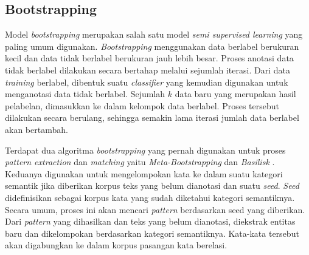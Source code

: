 \subsection{Bootstrapping}
Model \textit{bootstrapping} merupakan salah satu model \textit{semi supervised learning} yang paling umum digunakan. \textit{Bootstrapping} menggunakan data berlabel berukuran kecil dan data tidak berlabel berukuran jauh lebih besar. Proses anotasi data tidak berlabel dilakukan secara bertahap melalui sejumlah iterasi. Dari data \textit{training} berlabel, dibentuk suatu \textit{classifier} yang kemudian digunakan untuk menganotasi data tidak berlabel. Sejumlah $k$ data baru yang merupakan hasil pelabelan, dimasukkan ke dalam kelompok data berlabel. Proses tersebut dilakukan secara berulang, sehingga semakin lama iterasi jumlah data berlabel akan bertambah. 

Terdapat dua algoritma \textit{bootstrapping} yang pernah digunakan untuk proses \textit{pattern extraction} dan \textit{matching} yaitu \textit{Meta-Bootstrapping} dan \textit{Basilisk} \citep{riloff2003learning}. Keduanya digunakan untuk mengelompokan kata ke dalam suatu kategori semantik jika diberikan korpus teks yang belum dianotasi dan suatu \textit{seed}. \textit{Seed} didefinisikan sebagai korpus kata yang sudah diketahui kategori semantiknya. Secara umum, proses ini akan mencari \textit{pattern} berdasarkan seed yang diberikan. Dari \textit{pattern} yang dihasilkan dan teks yang belum dianotasi, diekstrak entitas baru dan dikelompokan berdasarkan kategori semantiknya. Kata-kata tersebut akan digabungkan ke dalam korpus pasangan kata berelasi.

